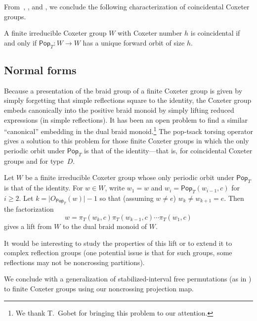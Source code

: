 \documentclass[ALCO,ThmDefs,Unicode,epreuves]{cedram}
\newcommand{\pop}{\mathsf{Pop}}
\begin{document}
From~, , and , we conclude the following characterization of coincidental Coxeter groups.
\begin{coro}
\label{cor:main4}
A finite irreducible Coxeter group $W$ with Coxeter number $h$ is coincidental if and only if $\pop_T:W\to W$ has a unique forward orbit of size $h$.
\end{coro}



\subsection{Normal forms}
Because a presentation of the braid group of a finite Coxeter group is given by simply forgetting that simple reflections square to the identity, the Coxeter group embeds canonically into the positive braid monoid by simply lifting reduced expressions (in simple reflections).  It has been an open problem to find a similar ``canonical'' embedding in the dual braid monoid.\footnote{We thank T.~Gobet for bringing this problem to our attention.}  The pop-tsack torsing operator gives a solution to this problem for those finite Coxeter groups in which the only periodic orbit under $\pop_T$ is that of the identity---that is, for coincidental Coxeter groups and for type~$D$.


\begin{theorem}
Let $W$ be a finite irreducible Coxeter group whose only periodic orbit under $\pop_T$ is that of the identity.  For $w\in W$, write $w_1=w$ and $w_i=\pop_T(w_{i-1},c)$ for $i\geq 2$. Let $k=\lvert O_{\pop_T}(w)\rvert-1$ so that (assuming $w\neq e$) $w_k\neq w_{k+1}=e$.  Then the factorization 
\[
w=\pi_T(w_k,c)\pi_T(w_{k-1},c)\cdots\pi_T(w_1,c)
\]
 gives a lift from $W$ to the dual braid monoid of $W$.
\end{theorem}


It would be interesting to study the properties of this lift or to extend it to complex reflection groups (one potential issue is that for such groups, some reflections may not be noncrossing partitions).

We conclude with a generalization of stabilized-interval free permutations (as in \cite{callan2004counting,blitvic2014stabilized}) to finite Coxeter groups using our noncrossing projection map.
\end{document}
